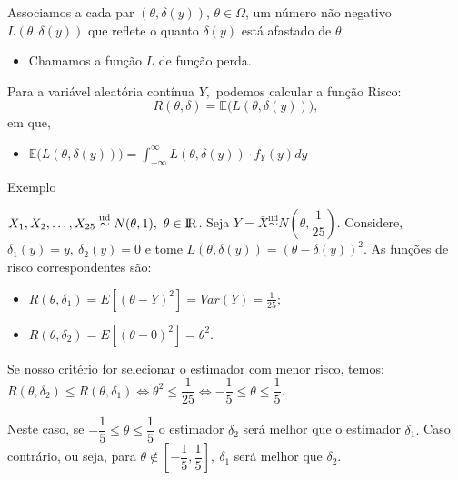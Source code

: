 \documentclass[12pt]{beamer}
\begin{document}
\begin{frame}{}
\begin{block}{}
\justifying
Associamos a cada par $(\theta, \delta(y))$, $\theta \in \Omega$, um número não negativo $L(\theta, \delta(y))$ que reflete o quanto $\delta(y)$ está afastado de $\theta.$ 
\begin{itemize}
    \item Chamamos a função $L$ de função perda. 
\end{itemize}
\end{block}
\pause
\begin{block}{}
Para a variável aleatória contínua $Y,$ podemos calcular a função Risco:
$$R(\theta, \delta) =\mathbb{E}\Big({L(\theta, \delta(y))}\Big),$$ 
em que,
\begin{itemize}
    \item $\mathbb{E}\Big({L(\theta, \delta(y))}\Big) = \int_{-\infty}^{\infty} L(\theta, \delta(y)) \cdot f_Y(y)dy$
\end{itemize}
\end{block}
\end{frame}

\begin{frame}{Exemplo}
\begin{block}{}
\justifying
$X_1, X_2, \ldots, X_{25}\overset{\text{iid}}{\sim} N(\theta, 1), ~ \theta \in \rm I\!R$. Seja $Y = \bar{X}\overset{\text{iid}}{\sim} N(\theta, \dfrac{1}{25}).$ Considere, $\delta_1(y) = y, ~\delta_2(y) = 0$ e tome $L(\theta, \delta(y)) = (\theta - \delta(y))^2.$ As funções de risco correspondentes são:
\begin{itemize}
    \item $R(\theta, \delta_1) = E[(\theta - Y)^2] = Var(Y) = \frac{1}{25};$
    \item $R(\theta, \delta_2) = E[(\theta - 0)^2] = \theta^2$.
\end{itemize}
\end{block}
\pause
\begin{block}{}
\justifying
Se nosso critério for selecionar o estimador com menor risco, temos:
$R(\theta, \delta_2)\leq R(\theta, \delta_1) \iff \theta^2\leq \dfrac{1}{25}\iff -\dfrac{1}{5}\leq \theta \leq \dfrac{1}{5}.$
\end{block}
\pause
\begin{block}{}
\justifying
Neste caso, se $-\dfrac{1}{5}\leq \theta \leq \dfrac{1}{5}$ o estimador $\delta_{2}$ será melhor que o estimador $\delta_{1}.$ Caso contrário, ou seja, para $\theta \not \in [-\dfrac{1}{5},\dfrac{1}{5}],~\delta_{1} $ será melhor que $\delta_{2}.$
\end{block}
\end{frame}
\end{document}
